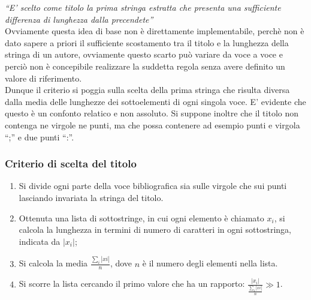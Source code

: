 \textit{``E' scelto come titolo la prima stringa estratta che presenta una sufficiente differenza di lunghezza dalla precendete''}\\

Ovviamente questa idea di base non è direttamente implementabile, perchè non è dato sapere a priori il sufficiente scostamento tra il titolo e la lunghezza della stringa di un autore, ovviamente questo scarto può variare da voce a voce e perciò non è concepibile realizzare la suddetta regola senza avere definito un valore di riferimento.\\
Dunque il criterio si poggia sulla scelta della prima stringa che risulta diversa dalla media delle lunghezze dei sottoelementi di ogni singola voce. E' evidente che questo è un confonto relatico e non assoluto. Si suppone inoltre che il titolo non contenga ne virgole ne punti, ma che possa contenere ad esempio punti e virgola ``;'' e due punti ``:''.
\\
\subsubsection{Criterio di scelta del titolo}
\begin{enumerate}
 \item Si divide ogni parte della voce bibliografica sia sulle virgole che sui punti lasciando invariata la stringa del titolo.
 \item Ottenuta una lista di sottostringe, in cui ogni elemento è chiamato $x_i$, si calcola la lunghezza in termini di numero di caratteri in ogni sottostringa, indicata da $|x_i|$;
 \item Si calcola la media $\frac{\sum_i |xi|}{n}$, dove $n$ è il numero degli elementi nella lista.
 \item Si scorre la lista cercando il primo valore che ha un rapporto: $ \frac{|x_i|}{\frac{\sum_i |xi|}{n} } \gg 1 $.
\end{enumerate}

